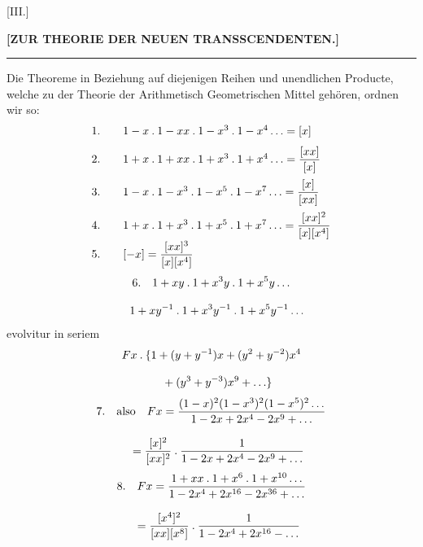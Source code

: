 \clearpage{}
\begin{center}
[III.]\par
\textbf{[ZUR THEORIE DER NEUEN TRANSSCENDENTEN.]}\par
\rule{13mm}{0.3pt}
\end{center}
Die Theoreme in Beziehung auf diejenigen Reihen und unendlichen Producte, welche zu der Theorie der Arithmetisch Geometrischen Mittel gehören,
ordnen wir so:
\[
\begin{array}{r@{\qquad}l}
1.&1-x\mathbin{.}1-xx\mathbin{.}1-x^3\mathbin{.}1-x^4\mathinner{.\,.\,.}=[x]\\[7pt]
2.&1+x\mathbin{.}1+xx\mathbin{.}1+x^3\mathbin{.}1+x^4\mathinner{.\,.\,.}=\dfrac{[xx]}{[x]}\\[11pt]
3.&1-x\mathbin{.}1-x^3\mathbin{.}1-x^5\mathbin{.}1-x^7\mathinner{.\,.\,.}=\dfrac{[x]}{[xx]}\\[11pt]
4.&1+x\mathbin{.}1+x^3\mathbin{.}1+x^5\mathbin{.}1+x^7\mathinner{.\,.\,.}=\dfrac{[xx]^2}{[x][x^4]}\\[7pt]
5.&[-x]=\dfrac{[xx]^3}{[x][x^4]}
\end{array}
\]
\[
\begin{gathered}6.\quad1+xy\mathbin{.}1+x^3y\mathbin{.}1+x^5y\mathinner{.\,.\,.}
\\[8pt]\quad{}1+xy^{-1}\mathbin{.}1+x^3y^{-1}\mathbin{.}1+x^5y^{-1}\mathinner{.\,.\,.}\end{gathered}
\]
evolvitur in seriem
\[
\begin{gathered}Fx\mathbin{.}\{1+(y+y^{-1})x+(y^2+y^{-2})x^4\\[8pt]\quad{}+(y^3+y^{-3})x^9+\mathinner{.\,.\,.}\}\end{gathered}
\]
\[
\begin{gathered}7.\quad\text{also}\quad
Fx=\frac{(1-x)^2(1-x^3)^2(1-x^5)^2\mathinner{.\,.\,.}}
{1-2x+2x^4-2x^9+\mathinner{.\,.\,.}}
\\[8pt]\quad{}=\frac{[x]^2}{[xx]^2}\mathbin{.}
\frac{1}{1-2x+2x^4-2x^9+\mathinner{.\,.\,.}}\end{gathered}
\]
\[
\begin{gathered}8.\quad Fx=
\frac{1+xx\mathbin{.}1+x^6\mathbin{.}1+x^{10}\mathinner{.\,.\,.}}
{1-2x^4+2x^{16}-2x^{36}+\mathinner{.\,.\,.}}
\\[8pt]\quad{}=\frac{[x^4]^2}{[xx][x^8]}\mathbin{.}
\frac{1}{1-2x^4+2x^{16}-\mathinner{.\,.\,.}}\end{gathered}
\]

